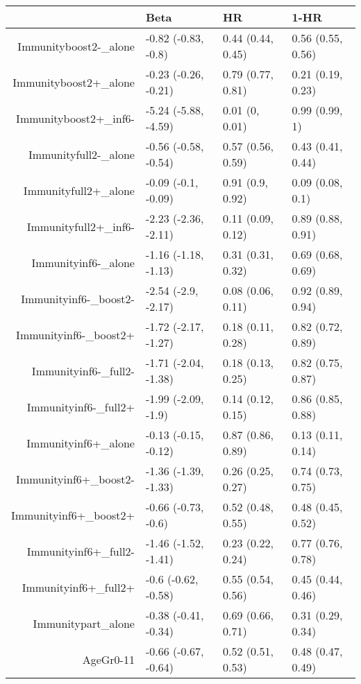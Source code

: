 \begin{table}[ht]
\centering
\begin{tabular}{rlll}
  \hline
 & Beta & HR & 1-HR \\ 
  \hline
Immunityboost2-\_alone & -0.82 (-0.83, -0.8) & 0.44 (0.44, 0.45) & 0.56 (0.55, 0.56) \\ 
  Immunityboost2+\_alone & -0.23 (-0.26, -0.21) & 0.79 (0.77, 0.81) & 0.21 (0.19, 0.23) \\ 
  Immunityboost2+\_inf6- & -5.24 (-5.88, -4.59) & 0.01 (0, 0.01) & 0.99 (0.99, 1) \\ 
  Immunityfull2-\_alone & -0.56 (-0.58, -0.54) & 0.57 (0.56, 0.59) & 0.43 (0.41, 0.44) \\ 
  Immunityfull2+\_alone & -0.09 (-0.1, -0.09) & 0.91 (0.9, 0.92) & 0.09 (0.08, 0.1) \\ 
  Immunityfull2+\_inf6- & -2.23 (-2.36, -2.11) & 0.11 (0.09, 0.12) & 0.89 (0.88, 0.91) \\ 
  Immunityinf6-\_alone & -1.16 (-1.18, -1.13) & 0.31 (0.31, 0.32) & 0.69 (0.68, 0.69) \\ 
  Immunityinf6-\_boost2- & -2.54 (-2.9, -2.17) & 0.08 (0.06, 0.11) & 0.92 (0.89, 0.94) \\ 
  Immunityinf6-\_boost2+ & -1.72 (-2.17, -1.27) & 0.18 (0.11, 0.28) & 0.82 (0.72, 0.89) \\ 
  Immunityinf6-\_full2- & -1.71 (-2.04, -1.38) & 0.18 (0.13, 0.25) & 0.82 (0.75, 0.87) \\ 
  Immunityinf6-\_full2+ & -1.99 (-2.09, -1.9) & 0.14 (0.12, 0.15) & 0.86 (0.85, 0.88) \\ 
  Immunityinf6+\_alone & -0.13 (-0.15, -0.12) & 0.87 (0.86, 0.89) & 0.13 (0.11, 0.14) \\ 
  Immunityinf6+\_boost2- & -1.36 (-1.39, -1.33) & 0.26 (0.25, 0.27) & 0.74 (0.73, 0.75) \\ 
  Immunityinf6+\_boost2+ & -0.66 (-0.73, -0.6) & 0.52 (0.48, 0.55) & 0.48 (0.45, 0.52) \\ 
  Immunityinf6+\_full2- & -1.46 (-1.52, -1.41) & 0.23 (0.22, 0.24) & 0.77 (0.76, 0.78) \\ 
  Immunityinf6+\_full2+ & -0.6 (-0.62, -0.58) & 0.55 (0.54, 0.56) & 0.45 (0.44, 0.46) \\ 
  Immunitypart\_alone & -0.38 (-0.41, -0.34) & 0.69 (0.66, 0.71) & 0.31 (0.29, 0.34) \\ 
  AgeGr0-11 & -0.66 (-0.67, -0.64) & 0.52 (0.51, 0.53) & 0.48 (0.47, 0.49) \\ 

\end{tabular}
\end{table}
